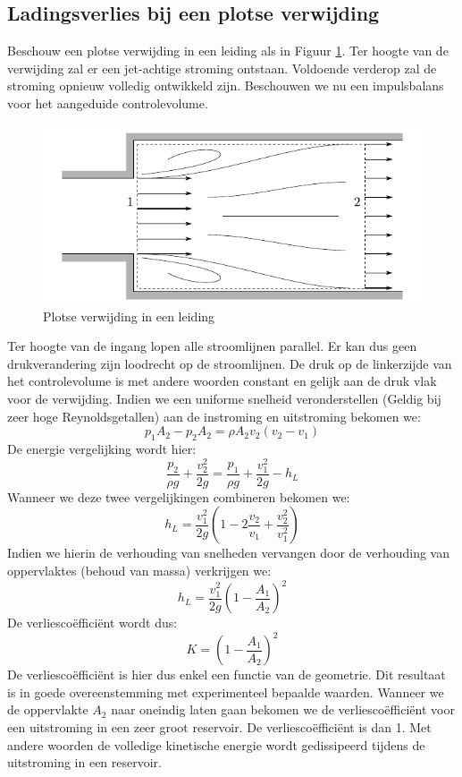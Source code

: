 	\subsection{Ladingsverlies bij een plotse verwijding}
Beschouw een plotse verwijding in een leiding als in Figuur \ref{fig:Plotse verwijding}. Ter hoogte van de verwijding zal er een jet-achtige stroming ontstaan. Voldoende verderop zal de stroming opnieuw volledig ontwikkeld zijn. Beschouwen we nu een impulsbalans voor het aangeduide controlevolume.
\begin{figure}
	\centering
	\includegraphics{fig/leidingstelsels/Plotse_verwijding}
	\caption{Plotse verwijding in een leiding}
	\label{fig:Plotse verwijding}
\end{figure}
Ter hoogte van de ingang lopen alle stroomlijnen parallel. Er kan dus geen drukverandering zijn loodrecht op de stroomlijnen. De druk op de linkerzijde van het controlevolume is met andere woorden constant en gelijk aan de druk vlak voor de verwijding. Indien we een uniforme snelheid veronderstellen (Geldig bij zeer hoge Reynoldsgetallen) aan de instroming en uitstroming bekomen we:
\begin{equation}
	p_1 A_2 - p_2 A_2 = \rho A_2 v_2 (v_2-v_1)
\end{equation}
De energie vergelijking wordt hier:
\begin{equation}
	\frac{p_2}{\rho g} + \frac{v_2^2}{2 g} = \frac{p_1}{\rho g} + \frac{v_1^2}{2 g} - h_L
\end{equation}
Wanneer we deze twee vergelijkingen combineren bekomen we:
\begin{equation}
	h_L = \frac{v_1^2}{2 g} \left(1 - 2\frac{v_2}{v_1} + \frac{v_2^2}{v_1^2} \right)
\end{equation}
Indien we hierin de verhouding van snelheden vervangen door de verhouding van oppervlaktes (behoud van massa) verkrijgen we:
\begin{equation}
	h_L = \frac{v_1^2}{2 g} \left(1 - \frac{A_1}{A_2} \right)^2
\end{equation}
De verliescoëfficiënt wordt dus:
\begin{equation}
	K = \left(1 - \frac{A_1}{A_2} \right)^2
\end{equation}
De verliescoëfficiënt is hier dus enkel een functie van de geometrie. Dit resultaat is in goede overeenstemming met experimenteel bepaalde waarden. Wanneer we de oppervlakte $A_2$ naar oneindig laten gaan bekomen we de verliescoëfficiënt voor een uitstroming in een zeer groot reservoir. De verliescoëfficiënt is dan 1. Met andere woorden de volledige kinetische energie wordt gedissipeerd tijdens de uitstroming in een reservoir.


